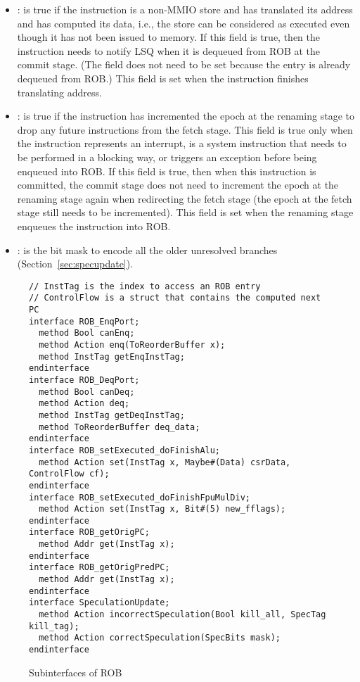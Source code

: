 \begin{itemize}
    \item {}: is true if the instruction is a non-MMIO store and has translated its address and has computed its data, i.e., the store can be considered as executed even though it has not been issued to memory.
    If this field is true, then the instruction needs to notify LSQ when it is dequeued from ROB at the commit stage.
    (The  field does not need to be set because the entry is already dequeued from ROB.)
    This field is set when the instruction finishes translating address.
    
    \item {}: is true if the instruction has incremented the epoch at the renaming stage to drop any future instructions from the fetch stage.
    This field is true only when the instruction represents an interrupt, is a system instruction that needs to be performed in a blocking way, or triggers an exception before being enqueued into ROB.
    If this field is true, then when this instruction is committed, the commit stage does not need to increment the epoch at the renaming stage again when redirecting the fetch stage (the epoch at the fetch stage still needs to be incremented).
    This field is set when the renaming stage enqueues the instruction into ROB.
    
    \item {}: is the bit mask to encode all the older unresolved branches (Section~\ref{sec:specupdate}).
\end{itemize}

\begin{figure}[!htb]
\begin{lstlisting}[caption={}]
// InstTag is the index to access an ROB entry
// ControlFlow is a struct that contains the computed next PC
interface ROB_EnqPort;
  method Bool canEnq;
  method Action enq(ToReorderBuffer x);
  method InstTag getEnqInstTag;
endinterface
interface ROB_DeqPort;
  method Bool canDeq;
  method Action deq;
  method InstTag getDeqInstTag;
  method ToReorderBuffer deq_data;
endinterface
interface ROB_setExecuted_doFinishAlu;
  method Action set(InstTag x, Maybe#(Data) csrData, ControlFlow cf);
endinterface
interface ROB_setExecuted_doFinishFpuMulDiv;
  method Action set(InstTag x, Bit#(5) new_fflags);
endinterface
interface ROB_getOrigPC;
  method Addr get(InstTag x);
endinterface
interface ROB_getOrigPredPC;
  method Addr get(InstTag x);
endinterface
interface SpeculationUpdate;
  method Action incorrectSpeculation(Bool kill_all, SpecTag kill_tag);
  method Action correctSpeculation(SpecBits mask);
endinterface
\end{lstlisting}
\caption{Subinterfaces of ROB}\label{fig:rob-subifc}
\end{figure}

